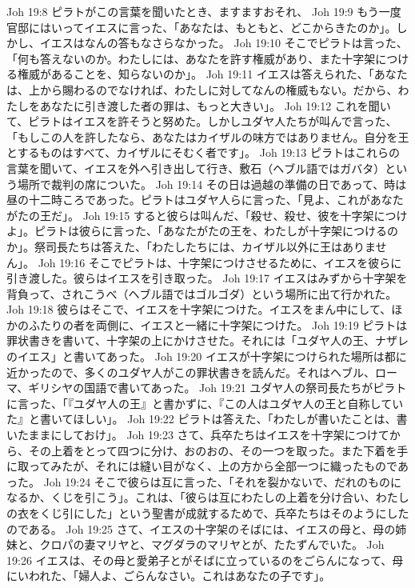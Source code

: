 Joh 19:8  ピラトがこの言葉を聞いたとき、ますますおそれ、
Joh 19:9  もう一度官邸にはいってイエスに言った、「あなたは、もともと、どこからきたのか」。しかし、イエスはなんの答もなさらなかった。
Joh 19:10  そこでピラトは言った、「何も答えないのか。わたしには、あなたを許す権威があり、また十字架につける権威があることを、知らないのか」。
Joh 19:11  イエスは答えられた、「あなたは、上から賜わるのでなければ、わたしに対してなんの権威もない。だから、わたしをあなたに引き渡した者の罪は、もっと大きい」。
Joh 19:12  これを聞いて、ピラトはイエスを許そうと努めた。しかしユダヤ人たちが叫んで言った、「もしこの人を許したなら、あなたはカイザルの味方ではありません。自分を王とするものはすべて、カイザルにそむく者です」。
Joh 19:13  ピラトはこれらの言葉を聞いて、イエスを外へ引き出して行き、敷石（ヘブル語ではガバタ）という場所で裁判の席についた。
Joh 19:14  その日は過越の準備の日であって、時は昼の十二時ころであった。ピラトはユダヤ人らに言った、「見よ、これがあなたがたの王だ」。
Joh 19:15  すると彼らは叫んだ、「殺せ、殺せ、彼を十字架につけよ」。ピラトは彼らに言った、「あなたがたの王を、わたしが十字架につけるのか」。祭司長たちは答えた、「わたしたちには、カイザル以外に王はありません」。
Joh 19:16  そこでピラトは、十字架につけさせるために、イエスを彼らに引き渡した。彼らはイエスを引き取った。
Joh 19:17  イエスはみずから十字架を背負って、されこうべ（ヘブル語ではゴルゴダ）という場所に出て行かれた。
Joh 19:18  彼らはそこで、イエスを十字架につけた。イエスをまん中にして、ほかのふたりの者を両側に、イエスと一緒に十字架につけた。
Joh 19:19  ピラトは罪状書きを書いて、十字架の上にかけさせた。それには「ユダヤ人の王、ナザレのイエス」と書いてあった。
Joh 19:20  イエスが十字架につけられた場所は都に近かったので、多くのユダヤ人がこの罪状書きを読んだ。それはヘブル、ローマ、ギリシヤの国語で書いてあった。
Joh 19:21  ユダヤ人の祭司長たちがピラトに言った、「『ユダヤ人の王』と書かずに、『この人はユダヤ人の王と自称していた』と書いてほしい」。
Joh 19:22  ピラトは答えた、「わたしが書いたことは、書いたままにしておけ」。
Joh 19:23  さて、兵卒たちはイエスを十字架につけてから、その上着をとって四つに分け、おのおの、その一つを取った。また下着を手に取ってみたが、それには縫い目がなく、上の方から全部一つに織ったものであった。
Joh 19:24  そこで彼らは互に言った、「それを裂かないで、だれのものになるか、くじを引こう」。これは、「彼らは互にわたしの上着を分け合い、わたしの衣をくじ引にした」という聖書が成就するためで、兵卒たちはそのようにしたのである。
Joh 19:25  さて、イエスの十字架のそばには、イエスの母と、母の姉妹と、クロパの妻マリヤと、マグダラのマリヤとが、たたずんでいた。
Joh 19:26  イエスは、その母と愛弟子とがそばに立っているのをごらんになって、母にいわれた、「婦人よ、ごらんなさい。これはあなたの子です」。
